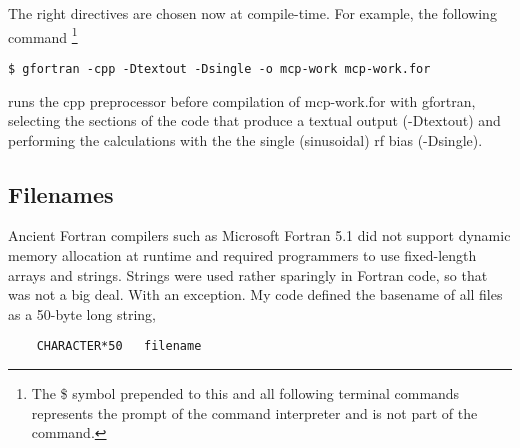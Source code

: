 The right directives are chosen now at compile-time. For example, the following command
\footnote{The \textsf{\$} symbol prepended to this and all following terminal commands represents the prompt of the command interpreter and is not part of the command.}

\begin{lstlisting}
$ gfortran -cpp -Dtextout -Dsingle -o mcp-work mcp-work.for
\end{lstlisting}

runs the \textsf{cpp} preprocessor before compilation of \textsf{mcp-work.for} with gfortran, selecting the sections of the code that produce a textual output (\textsf{-Dtextout}) and performing the calculations with the the single (sinusoidal) rf bias (\textsf{-Dsingle}).



\subsection{Filenames}

Ancient Fortran compilers such as Microsoft Fortran 5.1 did not support dynamic memory allocation at runtime and required programmers to use fixed-length arrays and strings. Strings were used rather sparingly in Fortran code, so that was not a big deal. With an exception. My code defined the basename of all files as a 50-byte long string,

\begin{lstlisting}
	CHARACTER*50   filename
\end{lstlisting}


